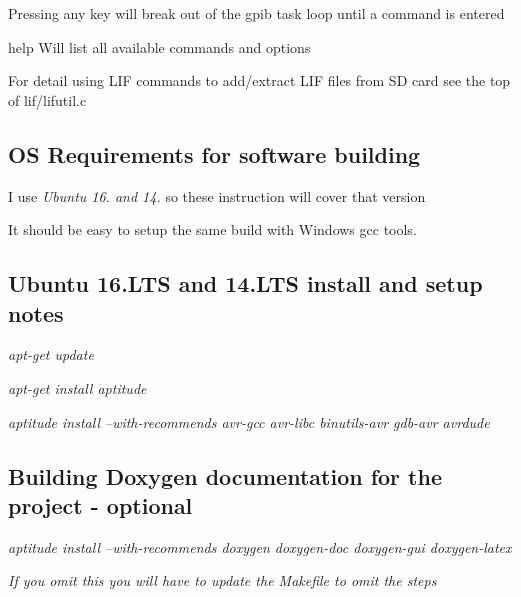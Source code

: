 {\bfseries 
\begin{DoxyItemize}
\item Pressing any key will break out of the gpib task loop until a command is entered
\begin{DoxyItemize}
\item help Will list all available commands and options
\item For detail using L\+IF commands to add/extract L\+IF files from SD card see the top of lif/lifutil.\+c 


\end{DoxyItemize}
\end{DoxyItemize}}

{\bfseries \subsection*{OS Requirements for software building}}

{\bfseries 
\begin{DoxyItemize}
\item I use {\itshape Ubuntu 16. and 14.} so these instruction will cover that version
\item It should be easy to setup the same build with Windows gcc tools.
\end{DoxyItemize}}

{\bfseries \subsection*{Ubuntu 16.\+L\+TS and 14.\+L\+TS install and setup notes}}

{\bfseries 
\begin{DoxyItemize}
\item {\itshape apt-\/get update}
\item {\itshape apt-\/get install aptitude}
\item {\itshape aptitude install --with-\/recommends avr-\/gcc avr-\/libc binutils-\/avr gdb-\/avr avrdude}
\end{DoxyItemize}}

{\bfseries \subsection*{Building Doxygen documentation for the project -\/ optional}}

{\bfseries 
\begin{DoxyItemize}
\item {\itshape aptitude install --with-\/recommends doxygen doxygen-\/doc doxygen-\/gui doxygen-\/latex}
\item {\itshape If you omit this you will have to update the Makefile to omit the steps}
\end{DoxyItemize}}

